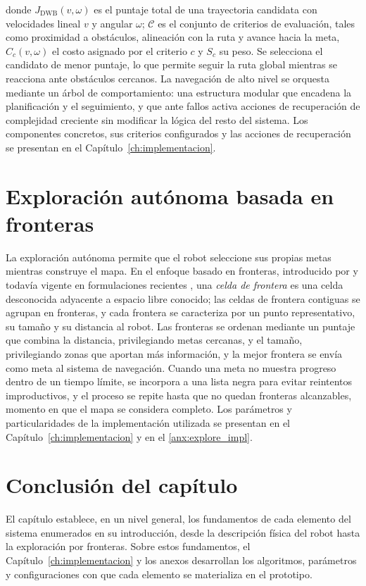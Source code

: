 \noindent donde $J_{\mathrm{DWB}}(v,\omega)$ es el puntaje total de una
trayectoria candidata con velocidades lineal $v$ y angular $\omega$;
$\mathcal{C}$ es el conjunto de criterios de evaluación, tales como
proximidad a obstáculos, alineación con la ruta y avance hacia la meta,
$C_c(v,\omega)$ el costo asignado por el criterio $c$ y $S_c$ su peso. Se
selecciona el candidato de menor puntaje, lo que permite seguir la ruta
global mientras se reacciona ante obstáculos cercanos. La navegación de alto
nivel se orquesta mediante un árbol de comportamiento: una estructura
modular que encadena la planificación y el seguimiento, y que ante fallos
activa acciones de recuperación de complejidad creciente sin modificar la
lógica del resto del sistema. Los componentes concretos, sus criterios
configurados y las acciones de recuperación se presentan en el
Capítulo~\ref{ch:implementacion}.

\section{Exploración autónoma basada en fronteras}
\label{sec:exploracion_marco}

La exploración autónoma permite que el robot seleccione sus propias metas
mientras construye el mapa. En el enfoque basado en fronteras, introducido por \citet{yamauchi1997frontier}
y todavía vigente en formulaciones recientes \citep{liu2025frontier}, una
\emph{celda de frontera} es una celda desconocida adyacente  a espacio libre conocido; las celdas de frontera
contiguas se agrupan en fronteras, y cada frontera se caracteriza por un
punto representativo, su tamaño y su distancia al robot. Las fronteras se
ordenan mediante un puntaje que combina la distancia, privilegiando metas
cercanas, y el tamaño, privilegiando zonas que aportan más información,
y la mejor frontera se envía como meta al sistema de navegación. Cuando una
meta no muestra progreso dentro de un tiempo límite, se incorpora a una
lista negra para evitar reintentos improductivos, y el proceso se repite
hasta que no quedan fronteras alcanzables, momento en que el mapa se
considera completo. Los parámetros y particularidades de la implementación
utilizada se presentan en el Capítulo~\ref{ch:implementacion} y en el
\ref{anx:explore_impl}.

\section*{Conclusión del capítulo}

El capítulo establece, en un nivel general, los fundamentos de cada elemento
del sistema enumerados en su introducción, desde la descripción física del
robot hasta la exploración por fronteras. Sobre estos fundamentos, el
Capítulo~\ref{ch:implementacion} y los anexos desarrollan los algoritmos,
parámetros y configuraciones con que cada elemento se materializa en el
prototipo.